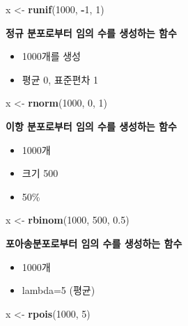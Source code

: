 \documentclass[]{article}
\newenvironment{Shaded}{\begin{snugshade}}{\end{snugshade}}
\newcommand{\KeywordTok}[1]{\textcolor[rgb]{0.13,0.29,0.53}{\textbf{#1}}}
\newcommand{\DecValTok}[1]{\textcolor[rgb]{0.00,0.00,0.81}{#1}}
\newcommand{\FloatTok}[1]{\textcolor[rgb]{0.00,0.00,0.81}{#1}}
\newcommand{\StringTok}[1]{\textcolor[rgb]{0.31,0.60,0.02}{#1}}
\newcommand{\OperatorTok}[1]{\textcolor[rgb]{0.81,0.36,0.00}{\textbf{#1}}}
\newcommand{\NormalTok}[1]{#1}
\providecommand{\tightlist}{%
  \setlength{\itemsep}{0pt}\setlength{\parskip}{0pt}}
\begin{document}
\begin{Shaded}
\begin{Highlighting}[]
\NormalTok{x <-}\StringTok{ }\KeywordTok{runif}\NormalTok{(}\DecValTok{1000}\NormalTok{, }\OperatorTok{-}\DecValTok{1}\NormalTok{, }\DecValTok{1}\NormalTok{)}
\end{Highlighting}
\end{Shaded}

\textbf{정규 분포로부터 임의 수를 생성하는 함수}

\begin{itemize}
\tightlist
\item
  1000개를 생성
\item
  평균 0, 표준편차 1
\end{itemize}

\begin{Shaded}
\begin{Highlighting}[]
\NormalTok{x <-}\StringTok{ }\KeywordTok{rnorm}\NormalTok{(}\DecValTok{1000}\NormalTok{, }\DecValTok{0}\NormalTok{, }\DecValTok{1}\NormalTok{)}
\end{Highlighting}
\end{Shaded}

\textbf{이항 분포로부터 임의 수를 생성하는 함수}

\begin{itemize}
\tightlist
\item
  1000개
\item
  크기 500
\item
  50\%
\end{itemize}

\begin{Shaded}
\begin{Highlighting}[]
\NormalTok{x <-}\StringTok{ }\KeywordTok{rbinom}\NormalTok{(}\DecValTok{1000}\NormalTok{, }\DecValTok{500}\NormalTok{, }\FloatTok{0.5}\NormalTok{)}
\end{Highlighting}
\end{Shaded}

\textbf{포아송분포로부터 임의 수를 생성하는 함수}

\begin{itemize}
\tightlist
\item
  1000개
\item
  lambda=5 (평균)
\end{itemize}

\begin{Shaded}
\begin{Highlighting}[]
\NormalTok{x <-}\StringTok{ }\KeywordTok{rpois}\NormalTok{(}\DecValTok{1000}\NormalTok{, }\DecValTok{5}\NormalTok{)}
\end{Highlighting}
\end{Shaded}
\end{document}

